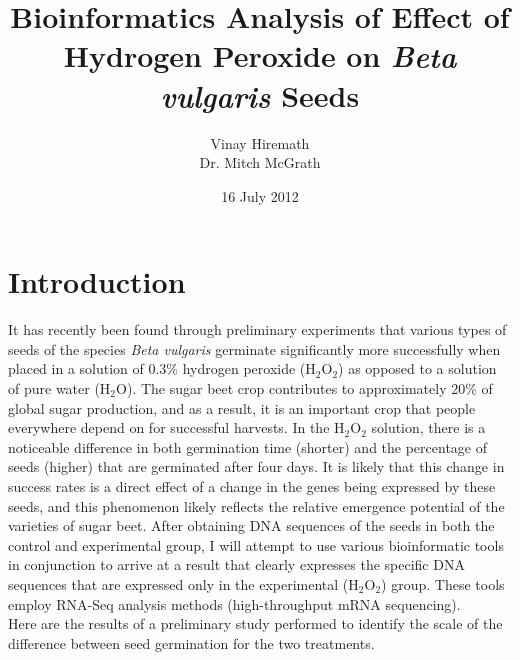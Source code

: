 \documentclass{article}
\begin{document}
\title{Bioinformatics Analysis of Effect of Hydrogen Peroxide on \emph{Beta vulgaris} Seeds}
\author{Vinay Hiremath \\ Dr. Mitch McGrath}
\date{16 July 2012}
\maketitle

\section{Introduction}
	It has recently been found through preliminary experiments that various types of seeds of the species \emph{Beta vulgaris} germinate significantly more successfully when placed in a solution of 0.3\% hydrogen peroxide (H$_{2}$O$_{2}$) as opposed to a solution of pure water (H$_{2}$O). The sugar beet crop contributes to approximately 20\% of global sugar production, and as a result, it is an important crop that people everywhere depend on for successful harvests. In the H$_{2}$O$_{2}$ solution, there is a noticeable difference in both germination time (shorter) and the percentage of seeds (higher) that are germinated after four days. It is likely that this change in success rates is a direct effect of a change in the genes being expressed by these seeds, and this phenomenon likely reflects the relative emergence potential of the varieties of sugar beet. After obtaining DNA sequences of the seeds in both the control and experimental group, I will attempt to use various bioinformatic tools in conjunction to arrive at a result that clearly expresses the specific DNA sequences that are expressed only in the experimental (H$_{2}$O$_{2}$) group. These tools employ RNA-Seq analysis methods (high-throughput mRNA sequencing).
\\
Here are the results of a preliminary study performed to identify the scale of the difference between seed germination for the two treatments.
\\
\end{document}

